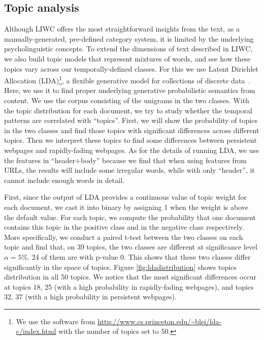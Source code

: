 \documentclass[phd,tocprelim]{cornell}
\begin{document}
\subsection{Topic analysis}

Although LIWC offers the most straightforward insights from the text, as a manually-generated, pre-defined category system, it is limited by the underlying psycholinguistic concepts.
To extend the dimensions of text described in LIWC, we also build topic models that represent mixtures of words,
and see how these topics vary across our temporally-defined classes.
For this we use 
Latent Dirichlet Allocation (LDA)\footnote{We use the software
from \url{http://www.cs.princeton.edu/~blei/lda-c/index.html}
with the number of topics set to 50.
}, a flexible generative model for collections of discrete data~\cite{Blei:03}. Here, we use it to find proper underlying generative probabilistic semantics from content. We use the corpus consisting of the unigrams in the two classes. 
With the topic distribution for each document, we try to study whether the temporal patterns are correlated with ``topics''. 
First, we will show the probability of topics in the two classes and find those topics with significant differences across different topics.  
Then we interpret these topics to find some differences between
persistent webpages and rapidly-fading webpages. As for the details of
running LDA, we use the features in ``header+body'' because we find
that when using features from URLs, the results will include some
irregular words, while with only ``header'', it cannot include enough
words in detail. 

First, since the output of LDA provides a
continuous value of topic weight for each document, we cast it into binary by assigning 1 when the weight is above the default value. For each topic, we compute the probability that one
document contains this topic in the positive class and in the negative class
respectively. More specifically, we conduct a paired t-test between the two classes on each topic and find that, on 39 topics, the two classes are  different at significance level $\alpha=5\%$. 24 of them are with p-value $0$. This shows that these two classes differ significantly in the space of topics.
Figure \ref{fig:ldadistribution} shows topics distribution in all 50 topics.  
We notice that the most significant differences occur at topics 18, 25 (with a high probability in rapidly-fading webpages), and topics 32, 37 (with a high probability in persistent webpages).
\end{document}

